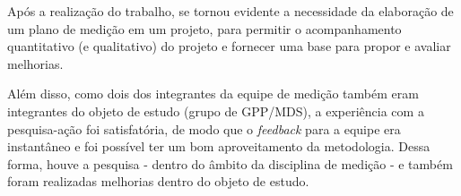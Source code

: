Após a realização do trabalho, se tornou evidente a necessidade da elaboração de um plano de medição em
um projeto, para permitir o acompanhamento quantitativo (e qualitativo) do projeto e fornecer uma base
para propor e avaliar melhorias.

Além disso, como dois dos integrantes da equipe de medição também eram integrantes do objeto de estudo
(grupo de GPP/MDS), a experiência com a pesquisa-ação foi satisfatória, de modo que o \textit{feedback}
para a equipe era instantâneo e foi possível ter um bom aproveitamento da metodologia. Dessa forma,
houve a pesquisa - dentro do âmbito da disciplina de medição - e também foram realizadas melhorias dentro do objeto de estudo.

